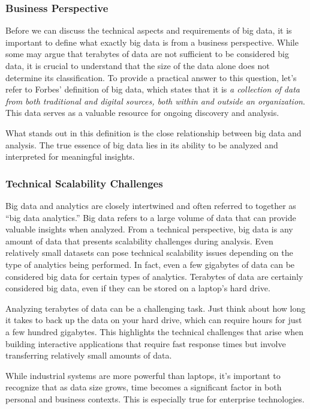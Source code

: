 \subsubsection{Business Perspective}

Before we can discuss the technical aspects and requirements of big
data, it is important to define what exactly big data is from a business
perspective. While some may argue that terabytes of data are not
sufficient to be considered big data, it is crucial to understand that
the size of the data alone does not determine its classification. To
provide a practical answer to this question, let's refer to Forbes'
definition of big data, which states that it is \textit{a collection of data
    from both traditional and digital sources, both within and outside an
    organization}. This data serves as a valuable resource for ongoing
discovery and analysis.

What stands out in this definition is the close relationship between big
data and analysis. The true essence of big data lies in its ability to
be analyzed and interpreted for meaningful insights.

\subsubsection{Technical Scalability Challenges}

Big data and analytics are closely intertwined and often referred to
together as ``big data analytics.'' Big data refers to a large volume of
data that can provide valuable insights when analyzed. From a technical
perspective, big data is any amount of data that presents scalability
challenges during analysis. Even relatively small datasets can pose
technical scalability issues depending on the type of analytics being
performed. In fact, even a few gigabytes of data can be considered big
data for certain types of analytics. Terabytes of data are certainly
considered big data, even if they can be stored on a laptop's hard
drive.

Analyzing terabytes of data can be a challenging task. Just think about
how long it takes to back up the data on your hard drive, which can
require hours for just a few hundred gigabytes. This highlights the
technical challenges that arise when building interactive applications
that require fast response times but involve transferring relatively
small amounts of data.

While industrial systems are more powerful than laptops, it's important
to recognize that as data size grows, time becomes a significant factor
in both personal and business contexts. This is especially true for
enterprise technologies.

